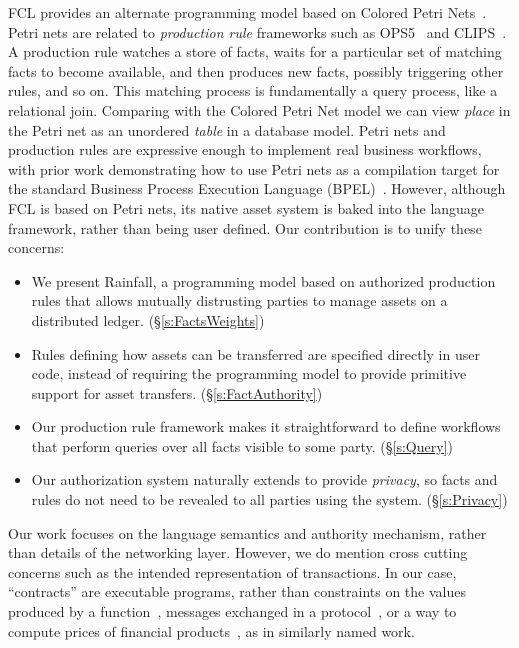 FCL provides an alternate programming model based on Colored Petri Nets~\cite{Jensen1981:ColouredPetri}. Petri nets are related to \emph{production rule} frameworks such as OPS5~\cite{Forgy1981:OPS5} and CLIPS~\cite{Riley2017:CLIPS}. A production rule watches a store of facts, waits for a particular set of matching facts to become available, and then produces new facts, possibly triggering other rules, and so on. This matching process is fundamentally a query process, like a relational join. Comparing with the Colored Petri Net model we can view \emph{place} in the Petri net as an unordered \emph{table} in a database model. Petri nets and production rules are expressive enough to implement real business workflows, with prior work demonstrating how to use Petri nets as a compilation target for the standard Business Process Execution Language (BPEL)~\cite{Lohmann2009:PetriBPEL}.  However, although FCL is based on Petri nets, its native asset system is baked into the language framework, rather than being user defined. Our contribution is to unify these concerns:


\begin{itemize}
\item We present Rainfall, a programming model based on authorized production rules that allows mutually distrusting parties to manage assets on a distributed ledger. (\S\ref{s:FactsWeights})

\item Rules defining how assets can be transferred are specified directly in user code, instead of requiring the programming model to provide primitive support for asset transfers. (\S\ref{s:FactAuthority})

\item Our production rule framework makes it straightforward to define workflows that perform queries over all facts visible to some party. (\S\ref{s:Query})

\item Our authorization system naturally extends to provide \emph{privacy}, so facts and rules do not need to be revealed to all parties using the system. (\S\ref{s:Privacy})

\end{itemize}

Our work focuses on the language semantics and authority mechanism, rather than details of the networking layer. However, we do mention cross cutting concerns such as the intended representation of transactions. In our case, ``contracts'' are executable programs, rather than constraints on the values produced by a function~\cite{Findler2002:Contracts}, messages exchanged in a protocol~\cite{Das2019:Resource, Deon2019:CSL}, or a way to compute prices of financial products~\cite{PeytonJones2000:Composing}, as in similarly named work.




